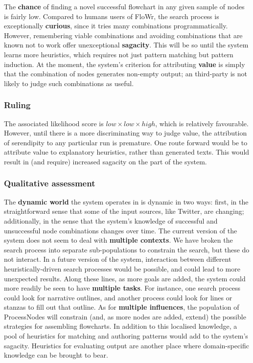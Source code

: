 The \textbf{chance} of finding a novel successful flowchart in any
given sample of nodes is fairly low.  Compared to humans users of {\sf
  FloWr}, the search process is exceptionally \textbf{curious}, since
it tries many combinations programmatically.  However, remembering
viable combinations and avoiding combinations that are known not to
work offer unexceptional \textbf{sagacity}.  This will be so until the
system learns more heuristics, which requires not just pattern
matching but pattern induction.  At the moment, the system's criterion
for attributing \textbf{value} is simply that the combination of nodes
generates non-empty output; an third-party is not likely to judge such
combinations as useful.

\subsubsection{Ruling}

The associated likelihood score is
$\mathit{low}\times\mathit{low}\times\mathit{high}$, which is
relatively favourable.  However, until there is a more discriminating
way to judge value, the attribution of serendipity to any particular
run is premature.  One route forward would be to attribute value to
explanatory heuristics, rather than generated texts.  This would
result in (and require) increased sagacity on the part of the system.

\subsubsection{Qualitative assessment}

The \textbf{dynamic world} the system operates in is dynamic in two
ways: first, in the straightforward sense that some of the input
sources, like Twitter, are changing; additionally, in the sense that
the system's knowledge of successful and unsuccessful node
combinations changes over time.  The current version of the system
does not seem to deal with \textbf{multiple contexts}.  We have broken
the search process into separate sub-populations to constrain the
search, but these do not interact.  In a future version of the system,
interaction between different heuristically-driven search processes
would be possible, and could lead to more unexpected results.  Along
these lines, as more goals are added, the system could more readily be
seen to have \textbf{multiple tasks}.  For instance, one search
process could look for narrative outlines, and another process could
look for lines or stanzas to fill out that outline.  As for
\textbf{multiple influences}, the population of ProcessNodes will
constrain (and, as more nodes are added, extend) the possible
strategies for assembling flowcharts.  In addition to this localised
knowledge, a pool of heuristics for matching and authoring patterns
would add to the system's sagacity.  Heuristics for evaluating output
are another place where domain-specific knowledge can be brought to
bear.


